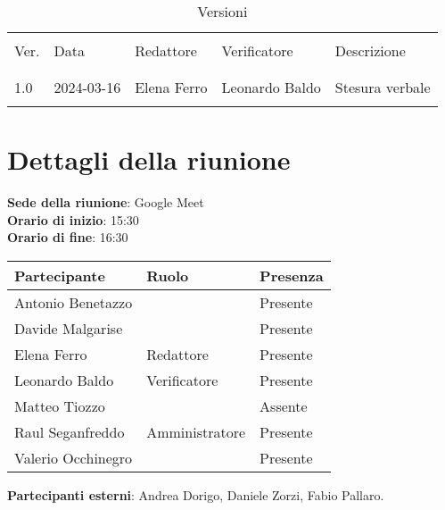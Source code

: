\documentclass[italian,12pt]{article}
\begin{document}


\newpage



\begin{table}[!h]
	\caption{Versioni}
	\footnotesize
	\begin{center}
		\begin{tabular}{ l l l l p{6cm} }
			\hline                                                             \\[-2ex]
			Ver. & Data       & Redattore   & Verificatore   & Descrizione     \\
			\\[-2ex] \hline \\[-1.5ex]
			1.0  & 2024-03-16 & Elena Ferro & Leonardo Baldo & Stesura verbale \\
			\\[-1.5ex] \hline
		\end{tabular}
	\end{center}
\end{table}

\newpage

\tableofcontents

\newpage

\section{Dettagli della riunione}


\textbf{Sede della riunione}: Google Meet\\
\textbf{Orario di inizio}: 15:30\\
\textbf{Orario di fine}: 16:30\\

\begin{flushleft}
	\begin{table}[!h]
		\begin{tabular}{ |l|l|l| }
			\hline
			\textbf{Partecipante} & \textbf{Ruolo} & \textbf{Presenza} \\
			\hline
			Antonio Benetazzo     &                & Presente          \\
			Davide Malgarise      &                & Presente          \\
			Elena Ferro           & Redattore      & Presente          \\
			Leonardo Baldo        & Verificatore   & Presente          \\
			Matteo Tiozzo         &                & Assente           \\
			Raul Seganfreddo      & Amministratore & Presente          \\
			Valerio Occhinegro    &                & Presente          \\
			\hline
		\end{tabular}
	\end{table}
	\textbf{Partecipanti esterni}: Andrea Dorigo, Daniele Zorzi, Fabio Pallaro.\\
\end{flushleft}
\end{document}
